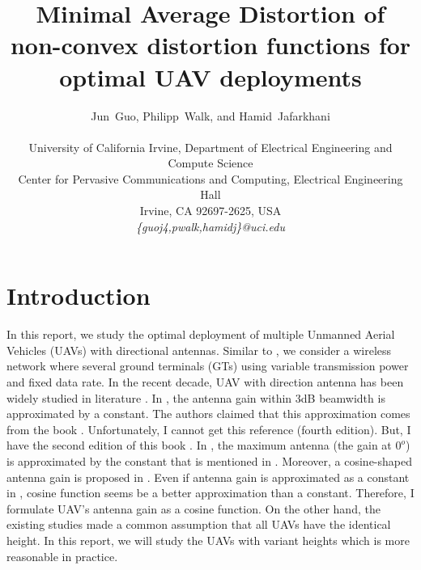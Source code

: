 \documentclass[smallabstract,smallcaptions]{dccpaper}
\begin{document}
%
\title{Minimal Average Distortion of non-convex distortion functions for optimal UAV deployments}


\newtheorem{corollary}{Corollary}


\author{Jun~Guo, Philipp~Walk, and Hamid~Jafarkhani\\
{\small\begin{minipage}{\linewidth}\begin{center}
\begin{tabular}{c}
University of California Irvine, Department of Electrical Engineering and Compute Science\\
Center for Pervasive Communications and Computing, Electrical Engineering Hall  \\
Irvine, CA 92697-2625, USA \\
{\it\{guoj4,pwalk,hamidj\}@uci.edu}
\end{tabular}
\end{center}\end{minipage}}
}

\maketitle



\section{Introduction}
%
In this report, we study the optimal deployment of multiple Unmanned Aerial Vehicles (UAVs) with directional antennas.
Similar to \cite{Erdem}, we consider a wireless network where several ground terminals (GTs) using variable transmission
power and fixed data rate.  In the recent decade, UAV with direction antenna has been widely studied in literature
\cite{BJL,MSF,HA,KMR,HSYR,MWMM}.  In \cite{BJL,MSF,HA,KMR,HSYR,MWMM}, the antenna gain within 3dB beamwidth is
approximated by a constant.  The authors claimed that this approximation comes from the book \cite{CAB4}.
Unfortunately, I cannot get this reference (fourth edition).  But, I have the second edition of this book \cite{CAB2}.
In \cite{CAB2}, the maximum antenna (the gain at $0^o$) is approximated by the constant that is mentioned in
\cite{BJL,MSF,HA,KMR,HSYR,MWMM}.  Moreover, a cosine-shaped antenna gain is proposed in \cite{CAB2}.  Even if antenna
gain is approximated as a constant in \cite{CAB4}, cosine function seems be a better approximation than a constant.
Therefore, I formulate UAV's antenna gain as a cosine function.  On the other hand, the existing studies \cite{Erdem}
made a common assumption that all UAVs have the identical height.  In this report, we will study the UAVs with variant
heights which is more reasonable in practice.
\end{document}
